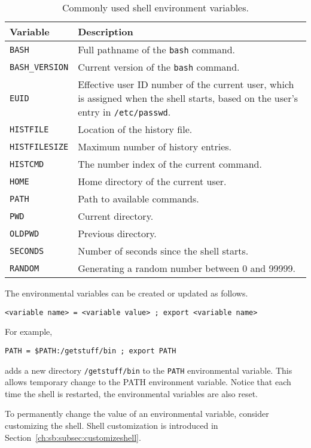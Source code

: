 \begin{table}[!htb]
	\centering \caption{Commonly used shell environment variables.}\label{ch:sb:tab:shellenvironmentvars}
	\begin{tabularx}{\textwidth}{lX}
		\hline
		Variable & Description \\ \hline
		\verb|BASH| & Full pathname of the \verb|bash| command. \\ 
		\verb|BASH_VERSION| & Current version of the \verb|bash| command. \\ 
		\verb|EUID| & Effective user ID number of the current user, which is assigned when the shell starts, based on the user's entry in \verb|/etc/passwd|. \\ 
		\verb|HISTFILE| & Location of the history file. \\ 
		\verb|HISTFILESIZE| & Maximum number of history entries. \\ 
		\verb|HISTCMD| & The number index of the current command. \\ 
		\verb|HOME| & Home directory of the current user. \\ 
		\verb|PATH| & Path to available commands. \\ 
		\verb|PWD| & Current directory. \\ 
		\verb|OLDPWD| & Previous directory. \\ 
		\verb|SECONDS| & Number of seconds since the shell starts. \\ 
		\verb|RANDOM| & Generating a random number between 0 and 99999. \\
		\hline
	\end{tabularx}
\end{table}

The environmental variables can be created or updated as follows.
\begin{lstlisting}
<variable name> = <variable value> ; export <variable name>
\end{lstlisting}
For example,
\begin{lstlisting}
PATH = $PATH:/getstuff/bin ; export PATH
\end{lstlisting}
adds a new directory \verb|/getstuff/bin| to the \verb|PATH| environmental variable. This allows temporary change to the PATH environment variable. Notice that each time the shell is restarted, the environmental variables are also reset. 

To permanently change the value of an environmental variable, consider customizing the shell. Shell customization is introduced in Section~\ref{ch:sb:subsec:customizeshell}.

